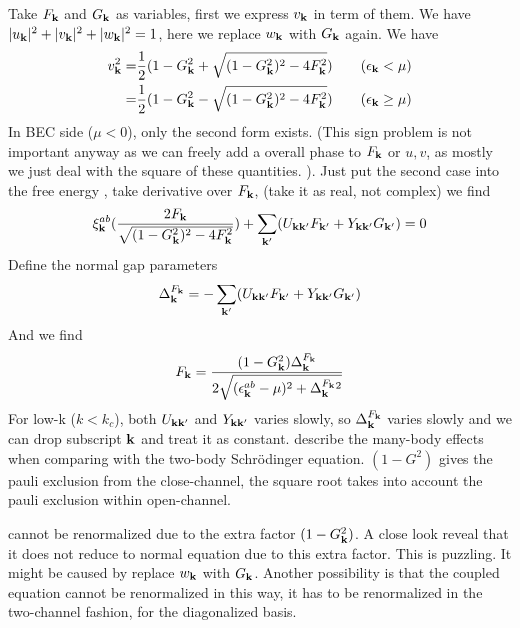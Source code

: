 Take $F_{\mathbf{k}}$ and $G_{\mathbf{k}}$ as variables, first we express $v_{\mathbf{k}}$ in term of them.  We have  $\lvert{u_{\ensuremath{\mathbf{k}}}}\rvert^2+\lvert{v_{\ensuremath{\mathbf{k}}}}\rvert^2+\lvert{w_{\ensuremath{\mathbf{k}}}}\rvert^2=1$, here we replace  $w_{\mathbf{k}}$  with  $G_{\mathbf{k}}$  again.  We have 
\[
\begin{split}
v_{\mathbf{k}}^2=&\frac{1}{2}(1-G_{\mathbf{k}}^{2}+\sqrt{(1-G_{\mathbf{k}}^{2})^{2}-4F_{\mathbf{k}}^{2}})\qquad (\epsilon_{\mathbf{k}}<\mu)\\
	=&\frac{1}{2}(1-G_{\mathbf{k}}^{2}-\sqrt{(1-G_{\mathbf{k}}^{2})^{2}-4F_{\mathbf{k}}^{2}})\qquad (\epsilon_{\mathbf{k}}\geq\mu)
\end{split}
\]
In BEC side ($\mu<0$), only the second form exists. (This sign problem is not important anyway as we can freely add a overall phase to $F_{\mathbf{k}}$ or $u,v$, as mostly we just deal with the square of these quantities. ).   Just put the second case into the free energy , take derivative over $F_{\mathbf{k}}$, (take it as real, not complex) we find 
\begin{equation}\label{eq:20100909:fEq}
\xi^{ab}_{\mathbf{k}}(\frac{2F_{\mathbf{k}}}{\sqrt{(1-G_{\mathbf{k}}^{2})^{2}-4F_{\mathbf{k}}^{2}}})+\sum_{\mathbf{k}'}(U_{\mathbf{k}\mathbf{k}'}F_{\mathbf{k}'}+Y_{\mathbf{k}\mathbf{k}'}G_{\mathbf{k}'})=0
\end{equation}
Define the normal gap parameters 
\begin{equation}\label{eq:20100909:gap}
\Delta^{F_{\mathbf{k}}}_{\mathbf{k}}=-\sum_{\mathbf{k}'}(U_{\mathbf{k}\mathbf{k}'}F_{\mathbf{k}'}+Y_{\mathbf{k}\mathbf{k}'}G_{\mathbf{k}'})
\end{equation}
And we find
\begin{equation}
F_{\mathbf{k}}=\frac{(1-G_{\mathbf{k}}^{2})\Delta^{F_{\mathbf{k}}}_{\mathbf{k}}}{2\sqrt{(\epsilon^{ab}_{\mathbf{k}}-\mu)^{2}+\Delta^{F_{\mathbf{k}}}_{\mathbf{k}}{}^{2}}}
\end{equation}
For low-k ($k<k_{c}$), both $U_{\mathbf{k}\mathbf{k}'}$ and $Y_{\mathbf{k}\mathbf{k}'}$ varies slowly, so $\Delta^{F_{\mathbf{k}}}_{\mathbf{k}}$ varies slowly and we can drop subscript $\mathbf{k}$ and treat it as constant.   describe the many-body effects when comparing with the two-body Schr\"{o}dinger equation.  $(1-G^{2})$ gives the pauli exclusion from the close-channel, the square root takes into account the pauli exclusion within open-channel.  

 cannot be renormalized due to the extra factor $(1-G_{\mathbf{k}}^{2})$.  A close look reveal that it does not reduce to normal \sch equation due to this extra factor.  This is puzzling.  It might be caused by replace $w_{\mathbf{k}}$ with $G_{\mathbf{k}}$.  Another possibility is that the coupled equation cannot be renormalized in this way, it has to be renormalized in the two-channel fashion, for the diagonalized  basis.  

